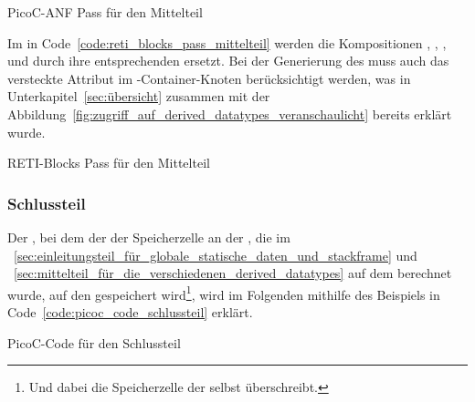 \begin{code}
  \centering
  \caption{PicoC-ANF Pass für den Mittelteil}
  \label{code:picoc_mon_pass_mittelteil}
\end{code}

Im  in Code~\ref{code:reti_blocks_pass_mittelteil} werden die Kompositionen , , ,  und  durch ihre entsprechenden  ersetzt. Bei der Generierung des  muss auch das \textcolor{gray!90!black}{versteckte Attribut}  im -Container-Knoten berücksichtigt werden, was in Unterkapitel~\ref{sec:übersicht} zusammen mit der Abbildung~\ref{fig:zugriff_auf_derived_datatypes_veranschaulicht} bereits erklärt wurde.

\begin{code}
  \centering
  \caption{RETI-Blocks Pass für den Mittelteil}
  \label{code:reti_blocks_pass_mittelteil}
\end{code}

\subsubsection{Schlussteil}
\label{sec:schlussteil_für_die_verschiedenen_derived_datatypes}

Der , bei dem der  der Speicherzelle an der , die im ~\ref{sec:einleitungsteil_für_globale_statische_daten_und_stackframe} und ~\ref{sec:mittelteil_für_die_verschiedenen_derived_datatypes} auf dem  berechnet wurde, auf den  gespeichert wird\footnote{Und dabei die Speicherzelle der  selbst überschreibt.}, wird im Folgenden mithilfe des Beispiels in Code~\ref{code:picoc_code_schlussteil} erklärt.

\begin{code}
  \centering
  \caption{PicoC-Code für den Schlussteil}
  \label{code:picoc_code_schlussteil}
\end{code}

